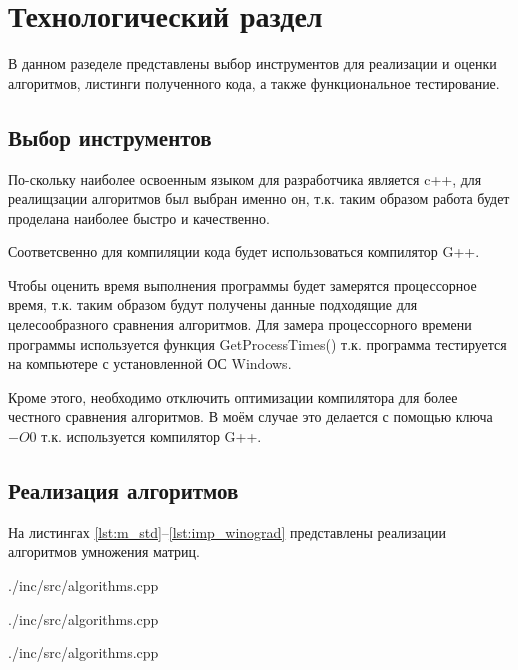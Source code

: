 \chapter{Технологический раздел}
В данном разеделе представлены выбор инструментов для реализации и оценки алгоритмов, листинги полученного кода, а также функциональное тестирование.

\section{Выбор инструментов}
По-скольку наиболее освоенным языком для разработчика является c++, для реалищзации алгоритмов был выбран именно он, т.к. таким образом работа будет проделана наиболее быстро и качественно.

Соответсвенно для компиляции кода будет использоваться компилятор G++.

Чтобы оценить время выполнения программы будет замерятся процессорное время, т.к. таким образом будут получены данные подходящие для целесообразного сравнения алгоритмов. Для замера процессорного времени программы используется функция GetProcessTimes() т.к. программа тестируется на компьютере с установленной ОС Windows. \cite{get_proccess_times}

Кроме этого, необходимо отключить оптимизации компилятора для более честного сравнения алгоритмов. В моём случае это делается с помощью ключа $-O0$ т.к. используется компилятор G++. \cite{optimization}

\section{Реализация алгоритмов}
На листингах \ref{lst:m_std}--\ref{lst:imp_winograd} представлены реализации алгоритмов умножения матриц.

\newpage
\begin{lstinputlisting}[
	caption={Классический алгоритм},
	label={lst:m_std},
	style={c},
	linerange={1-14},
	]{./inc/src/algorithms.cpp}
\end{lstinputlisting}

\begin{lstinputlisting}[
	caption={Алгоритм Винограда},
	label={lst:m_winograd},
	style={c},
	linerange={16-44},
	]{./inc/src/algorithms.cpp}
\end{lstinputlisting}

\newpage
\begin{lstinputlisting}[
	caption={Оптимизированный алгоритм Винограда},
	label={lst:imp_winograd},
	style={c},
	linerange={46-77},
	]{./inc/src/algorithms.cpp}
\end{lstinputlisting}

